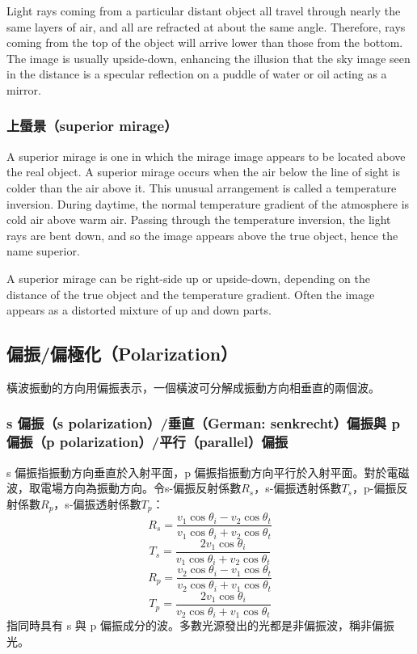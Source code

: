 \documentclass[a4paper,12pt]{report}
\begin{document}
Light rays coming from a particular distant object all travel through nearly the same layers of air, and all are refracted at about the same angle. Therefore, rays coming from the top of the object will arrive lower than those from the bottom. The image is usually upside-down, enhancing the illusion that the sky image seen in the distance is a specular reflection on a puddle of water or oil acting as a mirror.
\subsubsection{上蜃景（superior mirage）}
A superior mirage is one in which the mirage image appears to be located above the real object. A superior mirage occurs when the air below the line of sight is colder than the air above it. This unusual arrangement is called a temperature inversion. During daytime, the normal temperature gradient of the atmosphere is cold air above warm air. Passing through the temperature inversion, the light rays are bent down, and so the image appears above the true object, hence the name superior.

A superior mirage can be right-side up or upside-down, depending on the distance of the true object and the temperature gradient. Often the image appears as a distorted mixture of up and down parts.
\subsection{偏振/偏極化（Polarization）}
橫波振動的方向用偏振表示，一個橫波可分解成振動方向相垂直的兩個波。
\subsubsection{s 偏振（s polarization）/垂直（German: senkrecht）偏振與 p 偏振（p polarization）/平行（parallel）偏振}
s 偏振指振動方向垂直於入射平面，p 偏振指振動方向平行於入射平面。對於電磁波，取電場方向為振動方向。令s-偏振反射係數$R_s$，s-偏振透射係數$T_s$，p-偏振反射係數$R_p$，s-偏振透射係數$T_p$：
\[ R_s = \frac{v_1 \cos \theta_i - v_2 \cos \theta_t}{v_1 \cos \theta_i + v_2 \cos \theta_t} \]
\[ T_s = \frac{2 v_1 \cos \theta_i}{v_1 \cos \theta_i + v_2 \cos \theta_t} \]
\[ R_p = \frac{v_2 \cos \theta_i - v_1 \cos \theta_t}{v_2 \cos \theta_i + v_1 \cos \theta_t} \]
\[ T_p = \frac{2 v_1 \cos \theta_i}{v_2 \cos \theta_i + v_1 \cos \theta_t} \]
指同時具有 s 與 p 偏振成分的波。多數光源發出的光都是非偏振波，稱非偏振光。
\end{document}
